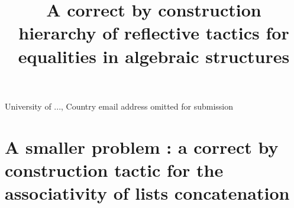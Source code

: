\documentclass{sigplanconf}
\begin{document}
\setlength{\pdfpageheight}{\paperheight}
\setlength{\pdfpagewidth}{\paperwidth}









\title{A correct by construction hierarchy of reflective tactics for equalities in algebraic structures}

           {University of ..., Country}
           {email address omitted for submission}



\maketitle

\nocite{*}










         
\section {A smaller problem : a correct by construction tactic for the associativity of lists concatenation}
\end{document}
